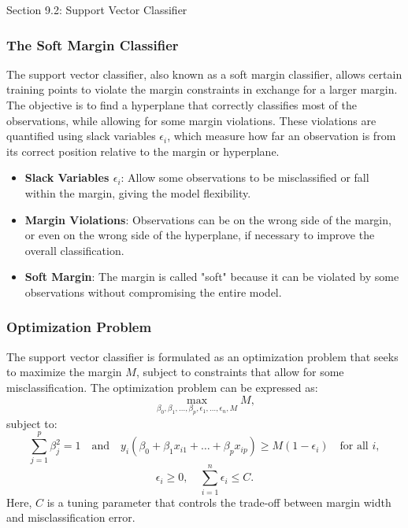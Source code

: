 \begin{notes}{Section 9.2: Support Vector Classifier}
    \subsubsection*{The Soft Margin Classifier}
    
    The support vector classifier, also known as a soft margin classifier, allows certain training points to violate the margin constraints in exchange for a larger margin. The objective is to find a hyperplane 
    that correctly classifies most of the observations, while allowing for some margin violations. These violations are quantified using slack variables $\epsilon_i$, which measure how far an observation is 
    from its correct position relative to the margin or hyperplane.
    
    \begin{highlight}
        \begin{itemize}
            \item \textbf{Slack Variables $\epsilon_i$}: Allow some observations to be misclassified or fall within the margin, giving the model flexibility.
            \item \textbf{Margin Violations}: Observations can be on the wrong side of the margin, or even on the wrong side of the hyperplane, if necessary to improve the overall classification.
            \item \textbf{Soft Margin}: The margin is called "soft" because it can be violated by some observations without compromising the entire model.
        \end{itemize}
    \end{highlight}
    
    \subsubsection*{Optimization Problem}
    
    The support vector classifier is formulated as an optimization problem that seeks to maximize the margin $M$, subject to constraints that allow for some misclassification. The optimization problem can 
    be expressed as:
    \[
    \max_{\beta_0, \beta_1, \dots, \beta_p, \epsilon_1, \dots, \epsilon_n, M} M,
    \]
    subject to:
    \[
    \sum_{j=1}^{p} \beta_j^2 = 1 \quad \text{and} \quad y_i (\beta_0 + \beta_1 x_{i1} + \dots + \beta_p x_{ip}) \geq M(1 - \epsilon_i) \quad \text{for all } i,
    \]
    \[
    \epsilon_i \geq 0, \quad \sum_{i=1}^{n} \epsilon_i \leq C.
    \]
    Here, $C$ is a tuning parameter that controls the trade-off between margin width and misclassification error.
    

\end{notes}
